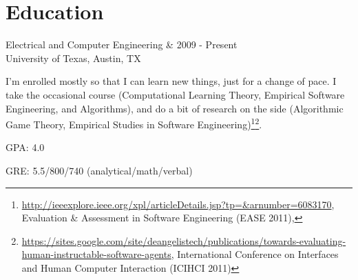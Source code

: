 \documentclass[letterpaper]{scrartcl}
\begin{document}
\section*{Education}
\begin{list1}
\item
  \begin{tabular1bold}Electrical and Computer Engineering & 2009 - Present \\
    University of Texas, Austin, TX
  \end{tabular1bold}

  \begin{adjustwidth}{1.5em}{1.5em}
    I'm enrolled mostly so that I can learn new things, just for a change of pace. I take the occasional course (Computational Learning Theory, Empirical Software Engineering, and Algorithms), and do a bit of research on the side (Algorithmic Game Theory, Empirical Studies in Software Engineering)\footnote{\href{Designing human benchmark experiments for testing software agents}{http://ieeexplore.ieee.org/xpl/articleDetails.jsp?tp=\&arnumber=6083170}, Evaluation \& Assessment in Software Engineering (EASE 2011), }\footnote{\href{Towards Evaluating Human-Instructable Software Agents}{https://sites.google.com/site/deangelistech/publications/towards-evaluating-human-instructable-software-agents}, International Conference on Interfaces and Human Computer Interaction (ICIHCI 2011)}.
  \end{adjustwidth}
  \begin{list2}
  \item GPA: 4.0
  \item GRE: 5.5/800/740 (analytical/math/verbal)
  \end{list2}


\end{list1}
\end{document}

